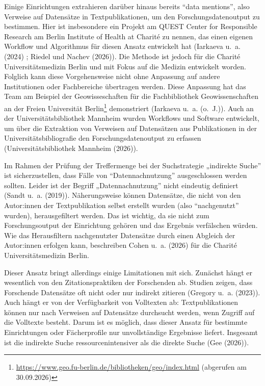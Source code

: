 \documentclass[
  ngerman,
  letterpaper,
  DIV=11]{scrreprt}
\begin{document}
Einige Einrichtungen extrahieren darüber hinaus bereits ``data
mentions'', also Verweise auf Datensätze in Textpublikationen, um den
Forschungsdatenoutput zu bestimmen. Hier ist insbesondere ein Projekt am
QUEST Center for Responsible Research am Berlin Institute of Health at
Charité zu nennen, das einen eigenen Workflow und Algorithmus für diesen
Ansatz entwickelt hat (Iarkaeva u.~a. (2024) ; Riedel und Nachev
(2026)). Die Methode ist jedoch für die Charité Universitätsmedizin
Berlin und mit Fokus auf die Medizin entwickelt worden. Folglich kann
diese Vorgehensweise nicht ohne Anpassung auf andere Institutionen oder
Fachbereiche übertragen werden. Diese Anpassung hat das Team am Beispiel
der Geowisseschaften für die Fachbibliothek Geowissenschaften an der
Freien Universität Berlin\footnote{\url{https://www.geo.fu-berlin.de/bibliotheken/geo/index.html}
  (abgerufen am 30.09.2026)} demonstriert (Iarkaeva u.~a. (o.~J.)). Auch
an der Universitätsbibliothek Mannheim wurden Workflows und Software
entwickelt, um über die Extraktion von Verweisen auf Datensätzen aus
Publikationen in der Universitätsbibliografie den Forschungsdatenoutput
zu erfassen (Universitätsbibliothek Mannheim (2026)).

Im Rahmen der Prüfung der Treffermenge bei der Suchstrategie „indirekte
Suche'' ist sicherzustellen, dass Fälle von ``Datennachnutzung''
ausgeschlossen werden sollten. Leider ist der Begriff
„Datennachnutzung'' nicht eindeutig definiert (Sandt u.~a. (2019)).
Näherungsweise können Datensätze, die nicht von den Autor:innen der
Textpublikation selbst erstellt wurden (also ``nachgenutzt'' wurden),
herausgefiltert werden. Das ist wichtig, da sie nicht zum
Forschungsoutput der Einrichtung gehören und das Ergebnis verfälschen
würden. Wie das Herausfiltern nachgenutzter Datensätze durch einen
Abgleich der Autor:innen erfolgen kann, beschreiben Cohen u.~a. (2026)
für die Charité Universitätsmedizin Berlin.

Dieser Ansatz bringt allerdings einige Limitationen mit sich. Zunächst
hängt er wesentlich von den Zitationspraktiken der Forschenden ab.
Studien zeigen, dass Forschende Datensätze oft nicht oder nur indirekt
zitieren (Gregory u.~a. (2023)). Auch hängt er von der Verfügbarkeit von
Volltexten ab: Textpublikationen können nur nach Verweisen auf
Datensätze durchsucht werden, wenn Zugriff auf die Volltexte besteht.
Darum ist es möglich, dass dieser Ansatz für bestimmte Einrichtungen
oder Fächerprofile nur unvollständige Ergebnisse liefert. Insgesamt ist
die indirekte Suche ressourcenintensiver als die direkte Suche (Gee
(2026)).
\end{document}
